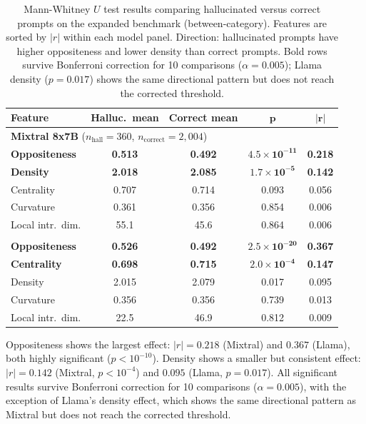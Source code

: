 \begin{table}[ht]
\centering
\small
\begin{tabular}{lcccc}
\toprule
\textbf{Feature} & \textbf{Halluc.\ mean} & \textbf{Correct mean} & $\boldsymbol{p}$ & $\boldsymbol{|r|}$ \\
\midrule
\multicolumn{5}{l}{\textbf{Mixtral 8x7B} ($n_{\text{hall}} = 360$, $n_{\text{correct}} = 2{,}004$)} \\
\addlinespace
\textbf{Oppositeness}    & \textbf{0.513} & \textbf{0.492} & $\boldsymbol{4.5 \times 10^{-11}}$ & \textbf{0.218} \\
\textbf{Density}         & \textbf{2.018} & \textbf{2.085} & $\boldsymbol{1.7 \times 10^{-5}}$  & \textbf{0.142} \\
Centrality      & 0.707 & 0.714 & 0.093                  & 0.056 \\
Curvature       & 0.361 & 0.356 & 0.854                  & 0.006 \\
Local intr.\ dim. & 55.1  & 45.6  & 0.864                  & 0.006 \\
\addlinespace
\midrule
\multicolumn{5}{l}{\textbf{Llama 4 Maverick} ($n_{\text{hall}} = 235$, $n_{\text{correct}} = 2{,}137$)} \\
\addlinespace
\textbf{Oppositeness}    & \textbf{0.526} & \textbf{0.492} & $\boldsymbol{2.5 \times 10^{-20}}$ & \textbf{0.367} \\
\textbf{Centrality}      & \textbf{0.698} & \textbf{0.715} & $\boldsymbol{2.0 \times 10^{-4}}$  & \textbf{0.147} \\
Density         & 2.015 & 2.079 & 0.017                  & 0.095 \\
Curvature       & 0.356 & 0.356 & 0.739                  & 0.013 \\
Local intr.\ dim. & 22.5  & 46.9  & 0.812                  & 0.009 \\
\bottomrule
\end{tabular}
\caption{Mann-Whitney $U$ test results comparing hallucinated versus correct prompts on the expanded benchmark (between-category). Features are sorted by $|r|$ within each model panel. Direction: hallucinated prompts have higher oppositeness and lower density than correct prompts. Bold rows survive Bonferroni correction for 10 comparisons ($\alpha = 0.005$); Llama density ($p = 0.017$) shows the same directional pattern but does not reach the corrected threshold.}
\label{tab:mann-whitney}
\end{table}

Oppositeness shows the largest effect: $|r| = 0.218$ (Mixtral) and $0.367$ (Llama), both highly significant ($p < 10^{-10}$). Density shows a smaller but consistent effect: $|r| = 0.142$ (Mixtral, $p < 10^{-4}$) and $0.095$ (Llama, $p = 0.017$). All significant results survive Bonferroni correction for 10 comparisons ($\alpha = 0.005$), with the exception of Llama's density effect, which shows the same directional pattern as Mixtral but does not reach the corrected threshold.

